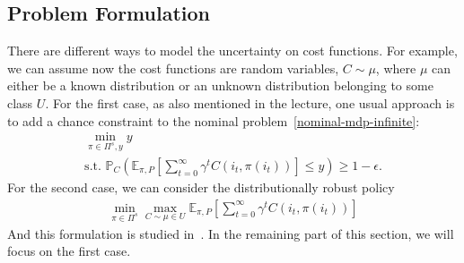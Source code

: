 \documentclass[11pt,reqno]{amsart}
\theoremstyle{definition}
\numberwithin{equation}{section}
\theoremstyle{remark}
\begin{document}
\subsection{Problem Formulation}
There are different ways to model the uncertainty on cost functions. For example, we can assume now the cost functions are random variables, $C\sim\mu$, where $\mu$ can either be a known distribution or an unknown distribution belonging to some class $U$. For the first case, as also mentioned in the lecture, one usual approach is to add a chance constraint to the nominal problem~\ref{nominal-mdp-infinite}:
\begin{equation}\label{cost-chance}
\begin{gathered}
    \min_{\pi\in\Pi^s, y} y \\
    \text{s.t. } \mathbb{P}_{C}\left(\mathbb{E}_{\pi,P} \left[\sum_{t=0}^{\infty}\gamma^t C(i_t, \pi(i_t))\right] \le y\right)\ge 1-\epsilon.
\end{gathered}
\end{equation}
For the second case, we can consider the distributionally robust policy
\begin{gather}\label{cost-dist-robust}
    \min_{\pi\in\Pi^s}\max_{C\sim\mu\in U}\mathbb{E}_{\pi,P} \left[\sum_{t=0}^{\infty}\gamma^t C(i_t, \pi(i_t))\right] 
\end{gather}
And this formulation is studied in~\cite{xu2010distributionally}. In the remaining part of this section, we will focus on the first case.

\end{document}
